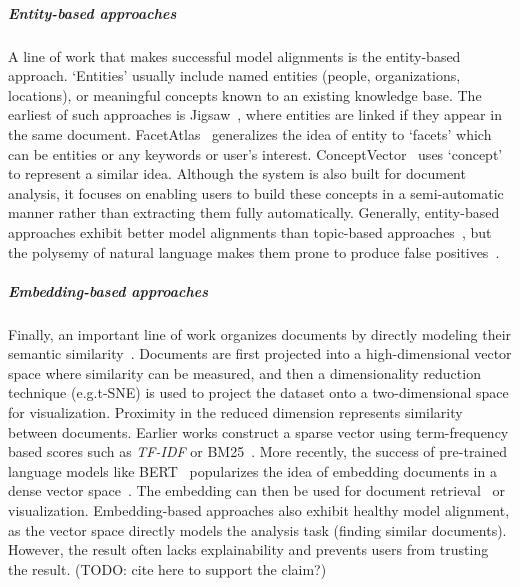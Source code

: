 \subparagraph{Entity-based approaches}
A line of work that makes successful model alignments is the entity-based approach.
`Entities' usually include named entities (people, organizations, locations), or meaningful concepts known to an existing knowledge base.
The earliest of such approaches is Jigsaw~\cite{Stasko2007jigasw}, where entities are linked if they appear in the same document.
FacetAtlas~\cite{cao2010facetatlas} generalizes the idea of entity to `facets' which can be entities or any keywords or user's interest.
ConceptVector~\cite{park2018conceptvector} uses `concept' to represent a similar idea. 
Although the system is also built for document analysis, it focuses on enabling users to build these concepts in a semi-automatic manner rather than extracting them fully automatically.
Generally, entity-based approaches exhibit better model alignments than topic-based approaches~\cite{chuang2012interpretation}, 
but the polysemy of natural language makes them prone to produce false positives~\cite{park2018conceptvector}.

\subparagraph{Embedding-based approaches}
Finally, an important line of work organizes documents by directly modeling their semantic similarity~\cite{steinbach2000doccluster}.
Documents are first projected into a high-dimensional vector space where similarity can be measured, and then a dimensionality reduction technique (e.g.t-SNE) is used to project the dataset onto a two-dimensional space for visualization.
Proximity in the reduced dimension represents similarity between documents.
Earlier works construct a sparse vector using term-frequency based scores such as \textit{TF-IDF} or BM25~\cite{choo2013utopian,sherkat2018interactive}.
More recently, the success of pre-trained language models like BERT~\cite{devlin2018bert} popularizes the idea of embedding documents in a dense vector space~\cite{narechania2022vitality,tu2023sdrquerier,qiu2022docflow}.
The embedding can then be used for document retrieval~\cite{karpukhin-etal-2020-dense, izacard2022unsupervised} or visualization.
Embedding-based approaches also exhibit healthy model alignment, as the vector space directly models the analysis task (finding similar documents). 
However, the result often lacks explainability and prevents users from trusting the result.  (TODO: cite here to support the claim?)

